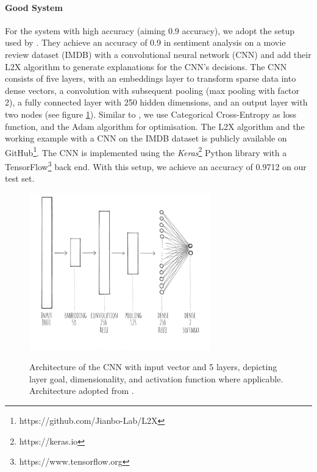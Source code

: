 \paragraph{Good System}
For the system with high accuracy (aiming 0.9 accuracy), we adopt the setup used by \cite{chen2018learning}. They achieve an accuracy of 0.9 in sentiment analysis on a movie review dataset (IMDB) with a convolutional neural network (CNN) and add their L2X algorithm to generate explanations for the CNN's decisions. The CNN consists of five layers, with an embeddings layer to transform sparse data into dense vectors, a convolution with subsequent pooling (max pooling with factor 2), a fully connected layer with 250 hidden dimensions, and an output layer with two nodes (see figure \ref{fig:impl_cnn}). Similar to \cite{chen2012detecting}, we use Categorical Cross-Entropy as loss function, and the Adam algorithm for optimisation. The L2X algorithm and the working example with a CNN on the IMDB dataset is publicly available on GitHub\footnote{https://github.com/Jianbo-Lab/L2X}. The CNN is implemented using the \textit{Keras}\footnote{https://keras.io} Python library with a TensorFlow\footnote{https://www.tensorflow.org} back end. With this setup, we achieve an accuracy of 0.9712 on our test set. 
\begin{figure} [!ht]
	\centering
	\includegraphics[width=0.7\textwidth]{img/impl_cnn.JPG}\\
	\caption{Architecture of the CNN with input vector and 5 layers, depicting layer goal, dimensionality, and activation function where applicable. Architecture adopted from \cite{chen2018learning}.}
	\label{fig:impl_cnn}
\end{figure}

